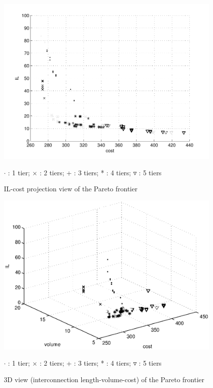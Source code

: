 \begin{figure}[h!]
\begin{center}
\includegraphics[width=\textwidth]{ultiplot1.pdf}
\begin{footnotesize}
$\cdot$ : 1 tier; $\times$ : 2 tiers; + : 3 tiers; * : 4 tiers; $\triangledown$ : 5 tiers\\
\end{footnotesize}
\caption{IL-cost projection view of the Pareto frontier}
\end{center}
\label{fig:ilcview}
\end{figure}

\begin{figure}[h!]
\begin{center}
\includegraphics[width=\textwidth]{ultiplot.eps}
\begin{small}
$\cdot$ : 1 tier; $\times$ : 2 tiers; + : 3 tiers; * : 4 tiers; $\triangledown$ : 5 tiers
\end{small}
\caption{3D view (interconnection length-volume-cost) of the Pareto frontier}
\end{center}
\label{fig:ds3dview}
\end{figure}

